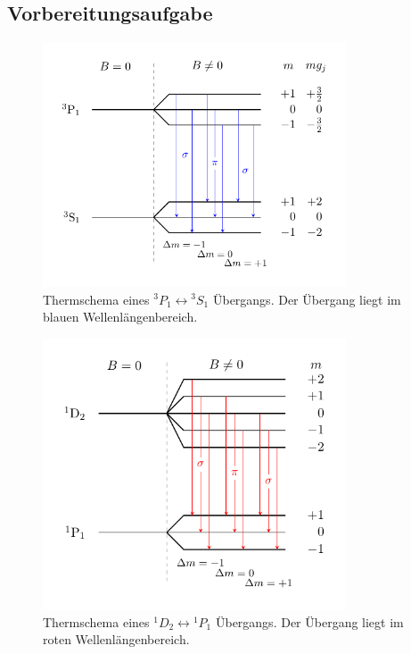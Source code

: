 \subsection{Vorbereitungsaufgabe}
\begin{figure}[h!]
  \centering
  \includegraphics[width=9cm]{termschema_blau.pdf}
  \caption{Thermschema eines ${}^3P_1\leftrightarrow {}^3S_1$ Übergangs. Der Übergang liegt im blauen Wellenlängenbereich.}
  \label{fig:blau}
\end{figure}
\begin{figure}[h!]
  \centering
  \includegraphics[width=9cm]{termschema_rot.pdf}
  \caption{Thermschema eines ${}^1D_2 \leftrightarrow {}^1P_1$ Übergangs. Der Übergang liegt im roten Wellenlängenbereich.}
  \label{fig:rot}
\end{figure}

